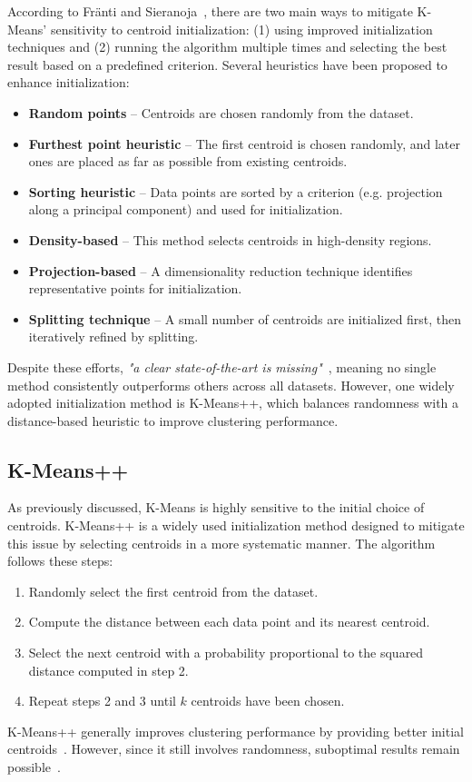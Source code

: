 \documentclass[10pt,twocolumn,letterpaper]{article}
\begin{document}
According to Fränti and Sieranoja~\cite{FRANTI201995}, there are two main ways
to mitigate K-Means’ sensitivity to centroid initialization: (1) using improved
initialization techniques and (2) running the algorithm multiple times and
selecting the best result based on a predefined criterion. Several heuristics
have been proposed to enhance initialization:
\begin{itemize}
    \item \textbf{Random points} – Centroids are chosen randomly from the dataset.
    \item \textbf{Furthest point heuristic} – The first centroid is chosen randomly, and later ones are placed as far as possible from existing centroids.
    \item \textbf{Sorting heuristic} – Data points are sorted by a criterion (e.g. projection along a principal component) and used for initialization.
    \item \textbf{Density-based} – This method selects centroids in high-density regions.
    \item \textbf{Projection-based} – A dimensionality reduction technique identifies representative points for initialization.
    \item \textbf{Splitting technique} – A small number of centroids are initialized first, then iteratively refined by splitting.
\end{itemize}
Despite these efforts, \textit{"a clear state-of-the-art is
    missing"}~\cite{FRANTI201995}, meaning no single method consistently
outperforms others across all datasets. However, one widely adopted
initialization method is K-Means++, which balances randomness with a
distance-based heuristic to improve clustering performance.


\subsection{K-Means++}\label{subsec:k-means++}

As previously discussed, K-Means is highly sensitive to the initial choice of
centroids. K-Means++ is a widely used initialization method designed to
mitigate this issue by selecting centroids in a more systematic manner. The
algorithm follows these steps:
\begin{enumerate}
    \item Randomly select the first centroid from the dataset.
    \item Compute the distance between each data point and its nearest centroid.
    \item Select the next centroid with a probability proportional to the squared
          distance computed in step 2.
    \item Repeat steps 2 and 3 until $k$ centroids have been chosen.
\end{enumerate}
K-Means++ generally improves clustering performance by providing better initial
centroids~\cite{FRANTI201995}. However, since it still involves randomness,
suboptimal results remain possible~\cite{deuschle2019, Abdullah10601123}.
\end{document}
